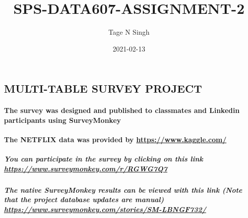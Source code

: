 \documentclass[
]{article}
\title{SPS-DATA607-ASSIGNMENT-2}
\author{Tage N Singh}
\date{2021-02-13}
\begin{document}
\maketitle

\hypertarget{multi-table-survey-project}{%
\subsection{\texorpdfstring{\textbf{MULTI-TABLE SURVEY
PROJECT}}{MULTI-TABLE SURVEY PROJECT}}\label{multi-table-survey-project}}

\hypertarget{the-survey-was-designed-and-published-to-classmates-and-linkedin-participants-using-surveymonkey}{%
\paragraph{\texorpdfstring{The survey was designed and published to
classmates and Linkedin participants using
\textbf{SurveyMonkey}}{The survey was designed and published to classmates and Linkedin participants using SurveyMonkey}}\label{the-survey-was-designed-and-published-to-classmates-and-linkedin-participants-using-surveymonkey}}

\hypertarget{the-netflix-data-was-provided-by-httpswww.kaggle.com}{%
\paragraph{\texorpdfstring{The NETFLIX data was provided by
\textbf{\url{https://www.kaggle.com/}}}{The NETFLIX data was provided by https://www.kaggle.com/}}\label{the-netflix-data-was-provided-by-httpswww.kaggle.com}}

\hypertarget{you-can-participate-in-the-survey-by-clicking-on-this-link-httpswww.surveymonkey.comrrgwg7q7}{%
\subparagraph{\texorpdfstring{You can participate in the survey by
clicking on this link
\textbf{\url{https://www.surveymonkey.com/r/RGWG7Q7}}}{You can participate in the survey by clicking on this link https://www.surveymonkey.com/r/RGWG7Q7}}\label{you-can-participate-in-the-survey-by-clicking-on-this-link-httpswww.surveymonkey.comrrgwg7q7}}

\hypertarget{the-native-surveymonkey-results-can-be-viewed-with-this-link-note-that-the-project-database-updates-are-manual-httpswww.surveymonkey.comstoriessm-lbngf732}{%
\subparagraph{\texorpdfstring{The native SurveyMonkey results can be
viewed with this link (\textbf{Note} that the project database updates
are manual)
\textbf{\url{https://www.surveymonkey.com/stories/SM-LBNGF732/}}}{The native SurveyMonkey results can be viewed with this link (Note that the project database updates are manual) https://www.surveymonkey.com/stories/SM-LBNGF732/}}\label{the-native-surveymonkey-results-can-be-viewed-with-this-link-note-that-the-project-database-updates-are-manual-httpswww.surveymonkey.comstoriessm-lbngf732}}
\end{document}
